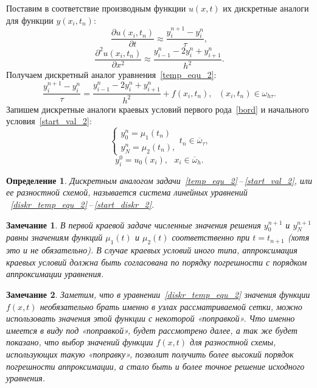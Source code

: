 \documentclass[11pt,a4paper,twoside]{report}
\numberwithin{equation}{section}
\newtheorem*{definition}{Определение}
\theoremstyle{definition}
\theoremstyle{plain}
\newtheorem{note}{Замечание}[section]
\begin{document}
Поставим в соответствие производным функции $u(x,t)$ их дискретные аналоги
для функции $y(x_i, t_n)$:
%
$$
    \frac{\partial u(x_i,t_n)}{\partial t} \approx \frac{y_i^{n+1} - y_i^n}{\tau},
$$
%
$$
    \frac{\partial^2 u(x_i,t_n)}{\partial x^2} \approx
    \frac{y_{i-1}^{n} - 2y_i^n + y_{i+1}^n}{h^2}.
$$
%
Получаем дискретный аналог уравнения~\eqref{temp_equ_2}:
%
\begin{equation}
%
    \label{diskr_temp_equ_2}
    \frac{y_i^{n+1} - y_i^n}{\tau} = \frac{y_{i-1}^{n} - 2y_i^n + y_{i+1}^n}{h^2}
    + f(x_i,t_n),~~~(x_i, t_n)\in \omega_{h \tau}.
%
\end{equation}
%
Запишем дискретные аналоги краевых условий первого рода~\eqref{bord}
и начального условия~\eqref{start_val_2}:
%
\begin{equation}
%
    \label{bord_diskr_2}
    \begin{cases}
            y_0^{n} = \mu_1(t_{n}) \\
            y_N^{n} = \mu_2(t_{n}),
        \end{cases}
        t_{n}\in \overline{\omega}_{\tau},
%
\end{equation}
%
%
\begin{equation}
%
    \label{start_diskr_2}
    y_i^0 = u_0(x_i),~~~x_i\in \overline{\omega}_h.
%
\end{equation}
%
%
\begin{definition}
%
    Дискретным аналогом задачи~\eqref{temp_equ_2}\,--\,\eqref{start_val_2},
    или ее разностной схемой, называется система линейных уравнений
   ~\eqref{diskr_temp_equ_2}\,--\,\eqref{start_diskr_2}.
%
\end{definition}
%
%
\begin{note}
    В первой краевой задаче численные значения решения $y_0^{n+1}$ и $y_N^{n+1}$
    равны значениям функций $\mu_1(t)$ и $\mu_2(t)$ соответственно при $t=t_{n+1}$
    (хотя это и не обязательно). В случае краевых условий иного типа, аппроксимация
    краевых условий должна быть согласована по порядку погрешности с порядком аппроксимации
    уравнения.
\end{note}
%
\begin{note}
%
    Заметим, что в уравнении~\eqref{diskr_temp_equ_2} значения функции $f(x,t)$
    необязательно брать именно в узлах рассматриваемой сетки, можно использовать
    значения этой функции с некоторой «поправкой». Что именно имеется в виду
    под «поправкой», будет рассмотрено далее, а так же будет показано, что
    выбор значений функции $f(x,t)$ для разностной схемы, использующих такую «поправку»,
    позволит получить более высокий порядок погрешности аппроксимации, а стало быть и
    более точное решение исходного уравнения.
%
\end{note}
\end{document}
